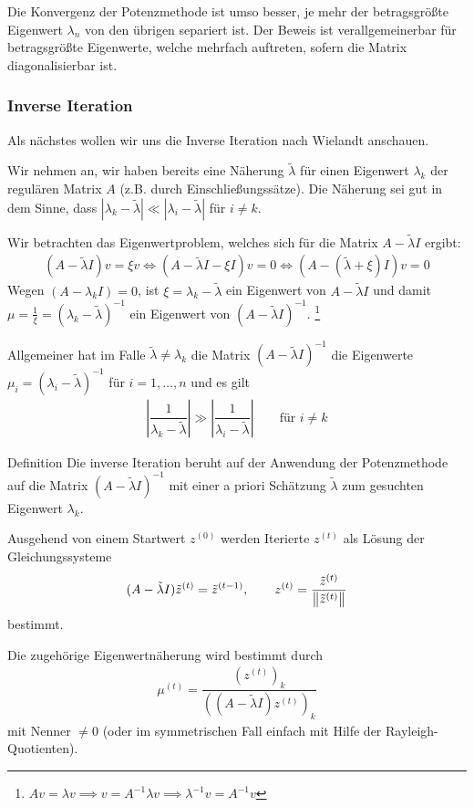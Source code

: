 Die Konvergenz der Potenzmethode ist umso besser, je mehr der betragsgrößte Eigenwert $\lambda_n$ von den übrigen 
separiert ist. Der Beweis ist verallgemeinerbar für betragsgrößte Eigenwerte, welche mehrfach 
auftreten, sofern die Matrix diagonalisierbar ist. 

\subsubsection{Inverse Iteration} 
Als nächstes wollen wir uns die \glqq{}Inverse Iteration\grqq{} nach
Wielandt anschauen. 

Wir nehmen an, wir haben bereits eine Näherung $\tilde{\lambda}$ für einen Eigenwert $\lambda_k$ der regulären Matrix 
$A$ (z.B. durch Einschließungssätze). Die Näherung sei gut in dem Sinne, 
dass $|\lambda_k-\tilde{\lambda}|\ll |\lambda_i-\tilde{\lambda}|$ für $i\neq k$.

Wir betrachten das Eigenwertproblem, welches sich für die Matrix $A-\tilde{\lambda}I$ ergibt:
%
\begin{align*}
  (A-\tilde{\lambda}I)v
  = \xi v 
  \iff 
  (A-\tilde{\lambda}I-\xi I)v 
  = 0 
  \iff (A-(\tilde{\lambda}+\xi)I)v
  = 0
\end{align*}
%
Wegen $(A-\lambda_kI)=0$, ist $\xi=\lambda_k-\tilde{\lambda}$ ein Eigenwert von $A-\tilde{\lambda}I$ und damit 
$\mu=\tfrac{1}{\xi}=(\lambda_k-\tilde{\lambda})^{-1}$ ein Eigenwert von $(A-\tilde{\lambda}I)^{-1}$.
\footnote{
    $Av=\lambda v \implies v = A^{-1}\lambda v \implies \lambda^{-1}v = A^{-1}v$
  } 

Allgemeiner hat im Falle $\tilde{\lambda}\neq\lambda_k$ die Matrix $(A-\tilde{\lambda}I)^{-1}$ die Eigenwerte 
$\mu_i = (\lambda_i-\tilde{\lambda})^{-1}$ für $i=1,\dots,n$ und es gilt 
%
\begin{align*}
  \left|\dfrac{1}{\lambda_k-\tilde{\lambda}}\right| 
  \gg \left|\dfrac{1}{\lambda_i-\tilde{\lambda}}\right|
  \qquad \text{für } i\neq k
\end{align*}

\begin{colbox}{Definition}
  Die inverse Iteration beruht auf der Anwendung der Potenzmethode auf die Matrix $(A-\tilde{\lambda}I)^{-1}$
  mit einer a priori Schätzung $\tilde{\lambda}$ zum gesuchten Eigenwert $\lambda_k$. 

  Ausgehend von einem Startwert $z^{(0)}$ werden Iterierte $z^{(t)}$ als Lösung der Gleichungssysteme
  \begin{align*}
    (A-\tilde{\lambda}I)\tilde{z}^{(t)} 
    = \tilde{z}^{(t-1)},
    \qquad 
    z^{(t)} 
    = \dfrac{\tilde{z}^{(t)}}{\vertn{2}{\tilde{z}^{(t)}}}
  \end{align*}
  bestimmt.

  Die zugehörige Eigenwertnäherung wird bestimmt durch 
  \begin{align*}
    \mu^{(t)}=\dfrac{(z^{(t)})_k}{((A-\tilde{\lambda}I)z^{(t)})_k}
  \end{align*}
  mit Nenner $\neq 0$ (oder im symmetrischen Fall einfach mit Hilfe der Rayleigh-Quotienten).
\end{colbox}

